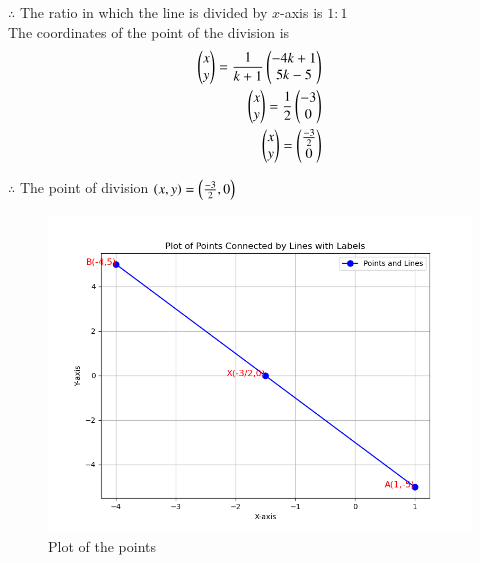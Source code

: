 \documentclass[journal]{IEEEtran}
\begin{document}
$\therefore$ The ratio in which the line is divided by $x$-axis is $1:1$ \\
The coordinates of the point of the division is \\
\begin{align}
\begin{pmatrix}
x \\
y \\
\end{pmatrix}
=\frac{1}{k+1}
\begin{pmatrix}
-4k+1 \\
5k-5 \\
\end{pmatrix} \label{eq1.1.5.10.9}
\\
\begin{pmatrix}
x \\
y\\
\end{pmatrix}
=\frac{1}{2}
\begin{pmatrix}
-3 \\
0 \\
\end{pmatrix} \label{eq1.1.5.10.10}
\\
\begin{pmatrix}
x \\
y \\
\end{pmatrix}
=
\begin{pmatrix}
\frac{-3}{2} \\
0 \\
\end{pmatrix} \label{eq1.1.5.10.11}
\end{align}

$\therefore$ The point of division $\left(x,y\right)=\left(\frac{-3}{2},0\right)$

\begin{figure}[h!]
\renewcommand{\thefigure}{1}
    \centering
    \includegraphics[width=0.7\linewidth]{figs/Figure_1.png}
    \caption{Plot of the points}
    \label{fig:enter-label}
\end{figure}
\end{document}

